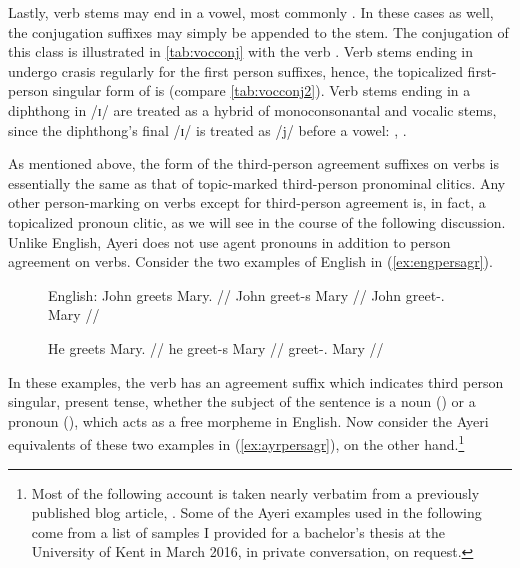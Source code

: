 Lastly, verb stems may end in a vowel, most commonly . In these cases as
well, the conjugation suffixes may simply be appended to the stem. The
conjugation of this class is illustrated in \autoref{tab:vocconj} with the verb
. Verb stems ending in  undergo crasis regularly for
the first person suffixes, hence, the topicalized first-person singular form of
 is  (compare
\autoref{tab:vocconj2}). Verb stems ending in a diphthong in /ɪ/ are
treated as a hybrid of monoconsonantal and vocalic stems, since the diphthong's
final /ɪ/ is treated as /j/ before a vowel: ,
.

As mentioned above, the form of the third-person agreement suffixes on verbs is
essentially the same as that of topic-marked third-person pronominal clitics.
Any other person-marking on verbs except for third-person agreement is, in
fact, a topicalized pronoun clitic, as we will see in the course of the
following discussion. Unlike English, Ayeri does not use agent pronouns in
addition to person agreement on verbs. Consider the two examples of English in
(\ref{ex:engpersagr}).

\begin{figure}[h]
\pex\label{ex:engpersagr}%
English:
\a\label{ex:vbagrengnn}\begingl
	\gla John greets Mary. //
	\glb John greet-s Mary //
	\glc John greet-\Tsg{}.\Prs{} Mary //
\endgl

\a\label{ex:vbagrengpr}\begingl
	\gla He greets Mary. //
	\glb he greet-s Mary //
	\glc \TsgM{} greet-\Tsg{}.\Prs{} Mary //
\endgl
\xe
\end{figure}

In these examples, the verb has an agreement suffix  which indicates
third person singular, present tense, whether the subject of the sentence is a
noun () or a pronoun (), which acts as a free morpheme in
English. Now consider the Ayeri equivalents of these two examples in
(\ref{ex:ayrpersagr}), on the other hand.\footnote{Most of the following
account is taken nearly verbatim from a previously published blog article,
\citet{benung:verbagreement}. Some of the Ayeri examples used in the following
come from a list of samples I provided for a bachelor's thesis at the
University of Kent in March 2016, in private conversation, on request.%
}

